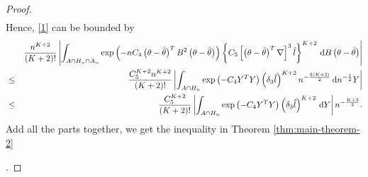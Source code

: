 \begin{proof}
\begin{eqnarray*}
\end{eqnarray*}
Hence, \eqref{1} can be bounded by 
\begin{eqnarray*}
 &  & \frac{n^{K+2}}{\left(K+2\right)!}\left|\int_{A\cap H_{n}\cap A_{n}}\exp\left(-nC_{4}\left(\theta-\tilde{\theta}\right)^{T}B^{2}\left(\theta-\tilde{\theta}\right)\right)\left\{ C_{5}\left[\left(\theta-\tilde{\theta}\right)^{T}\nabla\right]^{3}\hat{l}\right\} ^{K+2}\,\mathrm{d} B\left(\theta-\tilde{\theta}\right)\right|\\
 & \le & \frac{C_{5}^{K+2}n^{K+2}}{\left(K+2\right)!}\left|\int_{A\cap H_{n}}\exp\left(-C_{4}Y^{T}Y\right)\left(\delta_{3}\hat{l}\right)^{K+2}n^{-\frac{3\left(K+2\right)}{2}}\,\mathrm{d} n^{-\frac{1}{2}}Y\right|\\
 & \le & \frac{C_{5}^{K+2}}{\left(K+2\right)!}\left|\int_{A\cap H_{n}}\exp\left(-C_{4}Y^{T}Y\right)\left(\delta_{3}\hat{l}\right)^{K+2}\,\mathrm{d} Y\right|n^{-\frac{K+3}{2}}.
\end{eqnarray*}
Add all the parts together, we get the inequality in Theorem \ref{thm:main-theorem-2}%
\begin{comment}
add ref to main theorem
\end{comment}
.
\end{proof}

